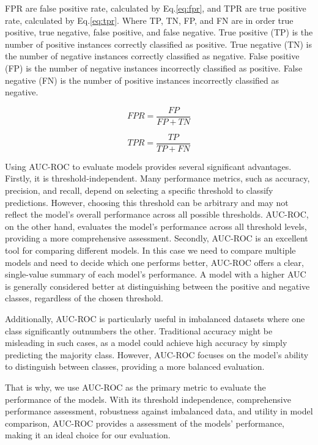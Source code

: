 \documentclass[../main.tex]{subfiles}
\begin{document}
FPR are false positive rate, calculated by Eq.\ref{eq:fpr}, and TPR are true positive rate, calculated by Eq.\ref{eq:tpr}.
Where TP, TN, FP, and FN are in order true positive, true negative, false positive, and false negative.
True positive (TP) is the number of positive instances correctly classified as positive.
True negative (TN) is the number of negative instances correctly classified as negative.
False positive (FP) is the number of negative instances incorrectly classified as positive.
False negative (FN) is the number of positive instances incorrectly classified as negative.

\begin{equation}
    \label{eq:fpr}
    FPR = \frac{FP}{FP + TN}
\end{equation}

\begin{equation}
    \label{eq:tpr}
    TPR = \frac{TP}{TP + FN}
\end{equation}

Using AUC-ROC to evaluate models provides several significant advantages.
Firstly, it is threshold-independent.
Many performance metrics, such as accuracy, precision, and recall, depend on selecting a specific threshold to classify predictions.
However, choosing this threshold can be arbitrary and may not reflect the model's overall performance across all possible thresholds.
AUC-ROC, on the other hand, evaluates the model's performance across all threshold levels, providing a more comprehensive assessment.
Secondly, AUC-ROC is an excellent tool for comparing different models.
In this case we need to compare multiple models and need to decide which one performs better, AUC-ROC offers a clear, single-value summary of each model's performance.
A model with a higher AUC is generally considered better at distinguishing between the positive and negative classes, regardless of the chosen threshold.

Additionally, AUC-ROC is particularly useful in imbalanced datasets where one class significantly outnumbers the other.
Traditional accuracy might be misleading in such cases, as a model could achieve high accuracy by simply predicting the majority class.
However, AUC-ROC focuses on the model's ability to distinguish between classes, providing a more balanced evaluation.

That is why, we use AUC-ROC as the primary metric to evaluate the performance of the models. With its threshold independence, comprehensive performance assessment, robustness against imbalanced data, and utility in model comparison, AUC-ROC provides a  assessment of the models' performance, making it an ideal choice for our evaluation.
\end{document}
